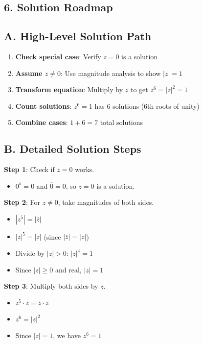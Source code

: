 \documentclass[11pt]{article}
\begin{document}
\begin{roadmapbox}
\section*{6. Solution Roadmap}

\subsection*{A. High-Level Solution Path}
\begin{enumerate}[leftmargin=*]
    \item \textbf{Check special case}: Verify $z = 0$ is a solution
    \item \textbf{Assume $z \neq 0$}: Use magnitude analysis to show $|z| = 1$
    \item \textbf{Transform equation}: Multiply by $z$ to get $z^6 = |z|^2 = 1$
    \item \textbf{Count solutions}: $z^6 = 1$ has 6 solutions (6th roots of unity)
    \item \textbf{Combine cases}: $1 + 6 = 7$ total solutions
\end{enumerate}

\subsection*{B. Detailed Solution Steps}

\textbf{Step 1}: Check if $z = 0$ works.
\begin{itemize}
    \item $0^5 = 0$ and $\overline{0} = 0$, so $z = 0$ is a solution.
\end{itemize}

\textbf{Step 2}: For $z \neq 0$, take magnitudes of both sides.
\begin{itemize}
    \item $|z^5| = |\overline{z}|$
    \item $|z|^5 = |z|$ (since $|\overline{z}| = |z|$)
    \item Divide by $|z| > 0$: $|z|^4 = 1$
    \item Since $|z| \geq 0$ and real, $|z| = 1$
\end{itemize}

\textbf{Step 3}: Multiply both sides by $z$.
\begin{itemize}
    \item $z^5 \cdot z = \overline{z} \cdot z$
    \item $z^6 = |z|^2$
    \item Since $|z| = 1$, we have $z^6 = 1$
\end{itemize}


\end{roadmapbox}
\end{document}
